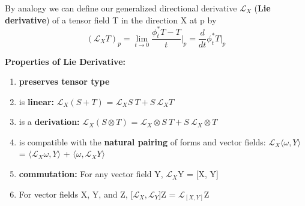 By analogy we can define our generalized directional derivative $\mathcal{L}_X$ (\textbf{Lie derivative})
of a tensor field T in the direction X at p by
\begin{equation}
    (\mathcal{L}_X T)_p =  \lim_{t\to 0} \frac{\phi_t^* T - T}{t} \Bigg|_{p} = \frac{d}{dt}\phi_t^* T \Bigg|_{p}
\end{equation}

\textbf{Properties of Lie Derivative:}
\begin{enumerate}
    \itemsep0em
    \item \textbf{preserves tensor type} 
    \item  is \textbf{linear: } $\mathcal{L}_X (S + T)$ = $\mathcal{L}_X S \: T + S \: \mathcal{L}_X T$ 
    \item is a \textbf{derivation: } $\mathcal{L}_X (S \otimes T)$ = $\mathcal{L}_X \otimes S \: T + S \: \mathcal{L}_X\otimes T$
    \item is compatible with the \textbf{natural pairing} of forms and vector fields: 
    $\mathcal{L}_X \langle\omega, Y \rangle$ = $\langle\mathcal{L}_X \omega, Y \rangle$ + $\langle\omega, \mathcal{L}_X Y \rangle$
    \item \textbf{commutation: } For any vector field Y, $\mathcal{L}_X$Y = [X, Y]
    \item For vector fields X, Y, and Z, [$\mathcal{L}_X, \mathcal{L}_Y$]Z = $\mathcal{L}_{[X, Y]}$Z
\end{enumerate}

\newpage
